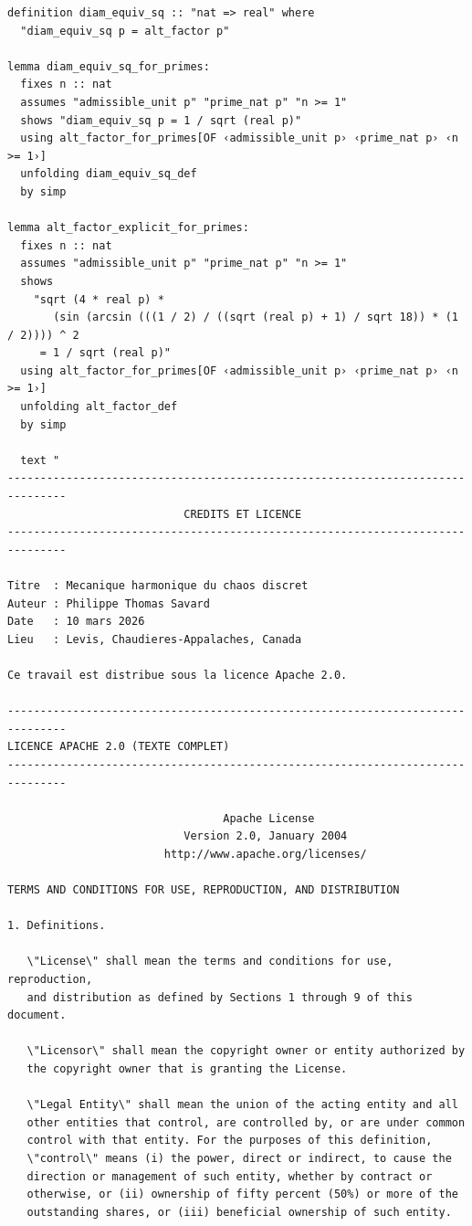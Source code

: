 \documentclass[12pt,a4paper]{article}
\theoremstyle{definition}
\theoremstyle{remark}
\begin{document}
\begin{verbatim}
definition diam_equiv_sq :: "nat => real" where
  "diam_equiv_sq p = alt_factor p"

lemma diam_equiv_sq_for_primes:
  fixes n :: nat
  assumes "admissible_unit p" "prime_nat p" "n >= 1"
  shows "diam_equiv_sq p = 1 / sqrt (real p)"
  using alt_factor_for_primes[OF ‹admissible_unit p› ‹prime_nat p› ‹n >= 1›]
  unfolding diam_equiv_sq_def
  by simp

lemma alt_factor_explicit_for_primes:
  fixes n :: nat
  assumes "admissible_unit p" "prime_nat p" "n >= 1"
  shows
    "sqrt (4 * real p) *
       (sin (arcsin (((1 / 2) / ((sqrt (real p) + 1) / sqrt 18)) * (1 / 2)))) ^ 2
     = 1 / sqrt (real p)"
  using alt_factor_for_primes[OF ‹admissible_unit p› ‹prime_nat p› ‹n >= 1›]
  unfolding alt_factor_def
  by simp

  text "
-------------------------------------------------------------------------------
                           CREDITS ET LICENCE
-------------------------------------------------------------------------------

Titre  : Mecanique harmonique du chaos discret
Auteur : Philippe Thomas Savard
Date   : 10 mars 2026
Lieu   : Levis, Chaudieres-Appalaches, Canada

Ce travail est distribue sous la licence Apache 2.0.

-------------------------------------------------------------------------------
LICENCE APACHE 2.0 (TEXTE COMPLET)
-------------------------------------------------------------------------------

                                 Apache License
                           Version 2.0, January 2004
                        http://www.apache.org/licenses/

TERMS AND CONDITIONS FOR USE, REPRODUCTION, AND DISTRIBUTION

1. Definitions.

   \"License\" shall mean the terms and conditions for use, reproduction,
   and distribution as defined by Sections 1 through 9 of this document.

   \"Licensor\" shall mean the copyright owner or entity authorized by
   the copyright owner that is granting the License.

   \"Legal Entity\" shall mean the union of the acting entity and all
   other entities that control, are controlled by, or are under common
   control with that entity. For the purposes of this definition,
   \"control\" means (i) the power, direct or indirect, to cause the
   direction or management of such entity, whether by contract or
   otherwise, or (ii) ownership of fifty percent (50%) or more of the
   outstanding shares, or (iii) beneficial ownership of such entity.


\end{verbatim}
\end{document}
